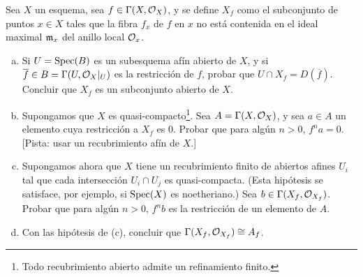 \documentclass[twoside]{article}
\begin{document}
%
%
%
%
%
%
%
%
%
%
%
%
\begin{ejercicio}{2.16}
Sea $X$ un esquema, sea $f\in\Gamma(X,{\mathcal O}_X)$, y se define $X_f$ como el subconjunto de puntos $x\in X$ tales que la fibra $f_x$ de $f$ en $x$ no está contenida en el ideal maximal $\mathfrak{m}_x$ del anillo local ${\mathcal O}_{x}$. 
\begin{enumerate}[(a)]
\item Si $U=\operatorname{Spec}(B)$ es un subesquema afín abierto de $X$, y si $\overline{f}\in B=\Gamma(U,{\mathcal O}_X|_U)$ es la restricción de $f$, probar que $U\cap X_f=D(\overline{f})$. Concluir que $X_f$ es un subconjunto abierto de $X$. 
\item Supongamos que $X$ es quasi-compacto\footnote{Todo recubrimiento abierto admite un refinamiento finito.}. Sea $A=\Gamma(X,{\mathcal O}_X)$, y sea $a\in A$ un elemento cuya restricción a $X_f$ es 0. Probar que para algún $n>0$, $f^na=0$. [Pista: usar un recubrimiento afín de $X$.]
\item Supongamos ahora que $X$ tiene un recubrimiento finito de abiertos afines $U_i$ tal que cada intersección $U_i\cap U_j$ es quasi-compacta. (Esta hipótesis se satisface, por ejemplo, si $\operatorname{Spec}(X)$ es noetheriano.) Sea $b\in\Gamma(X_f,{\mathcal O}_{X_f})$. Probar que para algún $n>0$, $f^nb$ es la restricción de un elemento de $A$.
\item Con las hipótesis de (c), concluir que $\Gamma(X_f,{\mathcal O}_{X_f})\cong A_f$.
\end{enumerate}
\end{ejercicio}
\end{document}
